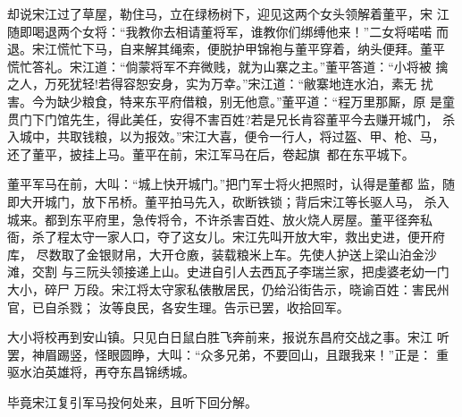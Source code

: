 却说宋江过了草屋，勒住马，立在绿杨树下，迎见这两个女头领解着董平，宋
江随即喝退两个女将：“我教你去相请董将军，谁教你们绑缚他来！”二女将喏喏
而退。宋江慌忙下马，自来解其绳索，便脱护甲锦袍与董平穿着，纳头便拜。董平
慌忙答礼。宋江道：“倘蒙将军不弃微贱，就为山寨之主。”董平答道：“小将被
擒之人，万死犹轻!若得容恕安身，实为万幸。”宋江道：“敝寨地连水泊，素无
扰害。今为缺少粮食，特来东平府借粮，别无他意。”董平道：“程万里那厮，原
是童贯门下门馆先生，得此美任，安得不害百姓?若是兄长肯容董平今去赚开城门，
杀入城中，共取钱粮，以为报效。”宋江大喜，便令一行人，将过盔、甲、枪、马，
还了董平，披挂上马。董平在前，宋江军马在后，卷起旗，都在东平城下。

董平军马在前，大叫：“城上快开城门。”把门军士将火把照时，认得是董都
监，随即大开城门，放下吊桥。董平拍马先入，砍断铁锁；背后宋江等长驱人马，
杀入城来。都到东平府里，急传将令，不许杀害百姓、放火烧人房屋。董平径奔私
衙，杀了程太守一家人口，夺了这女儿。宋江先叫开放大牢，救出史进，便开府库，
尽数取了金银财帛，大开仓廒，装载粮米上车。先使人护送上梁山泊金沙滩，交割
与三阮头领接递上山。史进自引人去西瓦子李瑞兰家，把虔婆老幼一门大小，碎尸
万段。宋江将太守家私俵散居民，仍给沿街告示，晓谕百姓：害民州官，已自杀戮；
汝等良民，各安生理。告示已罢，收拾回军。

大小将校再到安山镇。只见白日鼠白胜飞奔前来，报说东昌府交战之事。宋江
听罢，神眉踢竖，怪眼圆睁，大叫：“众多兄弟，不要回山，且跟我来！”正是：
重驱水泊英雄将，再夺东昌锦绣城。

毕竟宋江复引军马投何处来，且听下回分解。